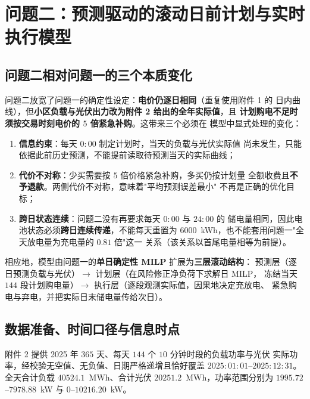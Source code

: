 \documentclass[withoutpreface,bwprint]{cumcmthesis}
\begin{document}
\section{问题二：预测驱动的滚动日前计划与实时执行模型}

\subsection{问题二相对问题一的三个本质变化}

问题二放宽了问题一的确定性设定：\textbf{电价仍逐日相同}（重复使用附件 1 的
日内曲线），但\textbf{小区负载与光伏出力改为附件 2 给出的全年实际值}，且
\textbf{计划购电不足时须按交易时刻电价的 $5$ 倍紧急补购}。这带来三个必须在
模型中显式处理的变化：

\begin{enumerate}
  \item \textbf{信息约束}：每天 $0{:}00$ 制定计划时，当天的负载与光伏实际值
        尚未发生，只能依据此前历史预测，不能提前读取待预测当天的实际曲线；
  \item \textbf{代价不对称}：少买需要按 $5$ 倍价格紧急补购，多买仍按计划量
        全额收费且\textbf{不予退款}。两侧代价不对称，意味着"平均预测误差最小"
        不再是正确的优化目标；
  \item \textbf{跨日状态连续}：问题二没有再要求每天 $0{:}00$ 与 $24{:}00$ 的
        储电量相同，因此电池状态必须\textbf{跨日连续传递}，不能每天重置为
        $6000$~kWh，也不能套用问题一"全天放电量为充电量的 $0.81$ 倍"这一
        关系（该关系以首尾电量相等为前提）。
\end{enumerate}

相应地，模型由问题一的\textbf{单日确定性 MILP} 扩展为\textbf{三层滚动结构}：
预测层（逐日预测负载与光伏）$\to$ 计划层（在风险修正净负荷下求解日 MILP，
冻结当天 $144$ 段计划购电量）$\to$ 执行层（逐段观测实际值，因果地决定充放电、
紧急购电与弃电，并把实际日末储电量传给次日）。

\subsection{数据准备、时间口径与信息时点}

附件 2 提供 2025 年 $365$ 天、每天 $144$ 个 $10$ 分钟时段的负载功率与光伏
实际功率，经校验无空值、无负值、日期严格递增且恰好覆盖
$2025{:}01{:}01$--$2025{:}12{:}31$。全天合计负载 $40524.1$~MWh、合计光伏
$20251.2$~MWh，功率范围分别为 $1995.72$--$7978.88$~kW 与
$0$--$10216.20$~kW。
\end{document}
